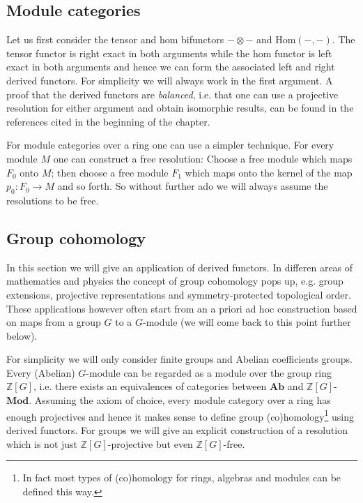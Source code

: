 \subsection{Module categories}\label{section:tor_ext}

	Let us first consider the tensor and hom bifunctors $-\otimes-$ and Hom$(-, -)$. The tensor functor is right exact in both arguments while the hom functor is left exact in both arguments and hence we can form the associated left and right derived functors. For simplicity we will always work in the first argument. A proof that the derived functors are \textit{balanced}, i.e. that one can use a projective resolution for either argument and obtain isomorphic results, can be found in the references cited in the beginning of the chapter.



	For module categories over a ring one can use a simpler technique. For every module $M$ one can construct a free resolution: Choose a free module which maps $F_0$ onto $M$; then choose a free module $F_1$ which maps onto the kernel of the map $p_0:F_0\rightarrow M$ and so forth. So without further ado we will always assume the resolutions to be free.

\subsection{Group cohomology}\label{section:group_cohomology}

	In this section we will give an application of derived functors. In differen areas of mathematics and physics the concept of group cohomology pops up, e.g. group extensions, projective representations and symmetry-protected topological order. These applications however often start from an a priori ad hoc construction based on maps from a group $G$ to a $G$-module (we will come back to this point further below).

	For simplicity we will only consider finite groups and Abelian coefficients groups. Every (Abelian) $G$-module can be regarded as a module over the group ring $\mathbb{Z}[G]$, i.e. there exists an equivalences of categories between $\mathbf{Ab}$ and $\mathbb{Z}[G]$-$\mathbf{Mod}$. Assuming the axiom of choice, every module category over a ring has enough projectives and hence it makes sense to define group (co)homology\footnote{In fact most types of (co)homology for rings, algebras and modules can be defined this way.} using derived functors. For groups we will give an explicit construction of a resolution which is not just $\mathbb{Z}[G]$-projective but even $\mathbb{Z}[G]$-free.

